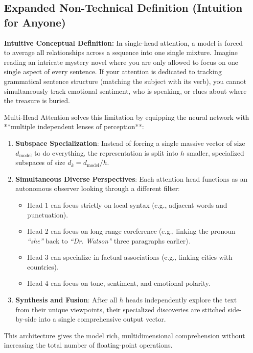 \documentclass[11pt,a4paper]{article}
\theoremstyle{definition}
\begin{document}
\subsection{Expanded Non-Technical Definition (Intuition for Anyone)}
\textbf{Intuitive Conceptual Definition:}
In single-head attention, a model is forced to average all relationships across a sequence into one single mixture. Imagine reading an intricate mystery novel where you are only allowed to focus on one single aspect of every sentence. If your attention is dedicated to tracking grammatical sentence structure (matching the subject with its verb), you cannot simultaneously track emotional sentiment, who is speaking, or clues about where the treasure is buried.

Multi-Head Attention solves this limitation by equipping the neural network with **multiple independent lenses of perception**:
\begin{enumerate}
    \item \textbf{Subspace Specialization}: Instead of forcing a single massive vector of size $d_{\text{model}}$ to do everything, the representation is split into $h$ smaller, specialized subspaces of size $d_k = d_{\text{model}} / h$.
    \item \textbf{Simultaneous Diverse Perspectives}: Each attention head functions as an autonomous observer looking through a different filter:
    \begin{itemize}
        \item Head 1 can focus strictly on local syntax (e.g., adjacent words and punctuation).
        \item Head 2 can focus on long-range coreference (e.g., linking the pronoun \emph{``she''} back to \emph{``Dr. Watson''} three paragraphs earlier).
        \item Head 3 can specialize in factual associations (e.g., linking cities with countries).
        \item Head 4 can focus on tone, sentiment, and emotional polarity.
    \end{itemize}
    \item \textbf{Synthesis and Fusion}: After all $h$ heads independently explore the text from their unique viewpoints, their specialized discoveries are stitched side-by-side into a single comprehensive output vector.
\end{enumerate}
This architecture gives the model rich, multidimensional comprehension without increasing the total number of floating-point operations.
\end{document}
